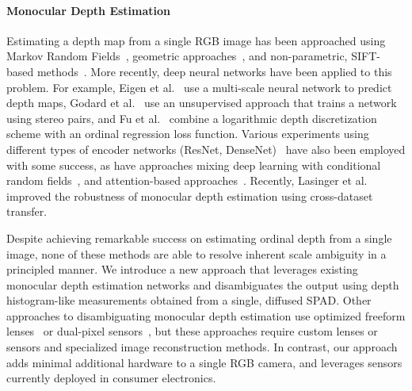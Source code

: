 

\paragraph{Monocular Depth Estimation}
%
Estimating a depth map from a single RGB image has been approached using Markov
Random Fields~\cite{Saxena2006}, geometric approaches~\cite{Hoiem2005}, and
non-parametric, SIFT-based methods~\cite{Karsch2014}. More recently, deep neural
networks have been applied to this problem. For example, Eigen et
al.~\cite{Eigen2014} use a multi-scale neural network to predict depth maps,
Godard et al.~\cite{Godard2017} use an unsupervised approach that trains a
network using stereo pairs, and Fu et al.~\cite{Fu2018} combine a logarithmic
depth discretization scheme with an ordinal regression loss function. Various
experiments using different types of encoder networks (\eg ResNet,
DenseNet)~\cite{Alhashim2018,Laina2016} have also been employed with some
success, as have approaches mixing deep learning with conditional random
fields~\cite{Xu2017}, and attention-based approaches~\cite{Hao2018,Xu2018}.
Recently, Lasinger et al.~\cite{Lasinger:2019} improved the robustness of
monocular depth estimation using cross-dataset transfer.

Despite achieving remarkable success on estimating ordinal depth from a single
image, none of these methods are able to resolve inherent scale ambiguity in a
principled manner. We introduce a new approach that leverages existing monocular
depth estimation networks and disambiguates the output using depth
histogram-like measurements obtained from a single, diffused SPAD. Other
approaches to disambiguating monocular depth estimation use optimized freeform
lenses~\cite{Chang:2019:DeepOptics3D,Wu:2019} or dual-pixel
sensors~\cite{Garg:2019}, but these approaches require custom lenses or sensors
and specialized image reconstruction methods. In contrast, our approach adds
minimal additional hardware to a single RGB camera, and leverages sensors currently
deployed in consumer electronics. 

